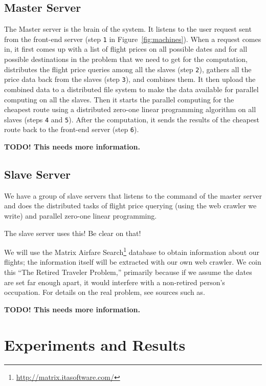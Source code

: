 \documentclass{article}
\begin{document}
\subsection{Master Server}\label{sec:master_server}

The Master server is the brain of the system. It listens to the user request sent from the front-end server (step \texttt{1} in
Figure~\ref{fig:machines}). When a request comes in, it first comes up with a list of flight prices on all possible dates and for all possible
destinations in the problem that we need to get for the computation, distributes the flight price queries among all the slaves (step \texttt{2}),
gathers all the price data back from the slaves (step \texttt{3}), and combines them. It then upload the combined data to a distributed file system to
make the data available for parallel computing on all the slaves. Then it starts the parallel computing for the cheapest route using a distributed
zero-one linear programming algorithm on all slaves (steps \texttt{4} and \texttt{5}). After the computation, it sends the results of the cheapest
route back to the front-end server (step \texttt{6}).

{\bf TODO! This needs more information.}

\subsection{Slave Server}\label{sec:slave_server}

We have a group of slave servers that listens to the command of the master server and does the distributed tasks of flight price querying (using the
web crawler we write) and parallel zero-one linear programming.

The slave server uses this! Be clear on that!

We will use the Matrix Airfare Search\footnote{\url{http://matrix.itasoftware.com/}} database to obtain information about our flights; the information
itself will be extracted with our own web crawler. We coin this ``The Retired Traveler Problem,'' primarily because if we assume the dates are set far
enough apart, it would interfere with a non-retired person's occupation. For details on the real problem, see sources such as.

{\bf TODO! This needs more information.}


\section{Experiments and Results}\label{sec:experiments_results}
\end{document}
